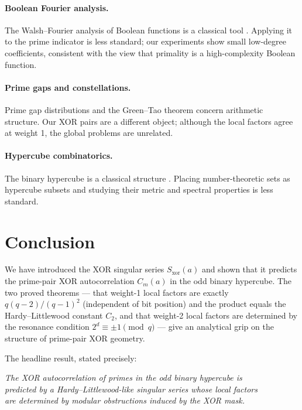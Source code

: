 \documentclass[12pt]{article}
\begin{document}
\paragraph{Boolean Fourier analysis.}
The Walsh--Fourier analysis of Boolean functions is a classical tool
\citep{odonnell2014}.  Applying it to the prime indicator is less standard;
our experiments show small low-degree coefficients, consistent with the
view that primality is a high-complexity Boolean function.

\paragraph{Prime gaps and constellations.}
Prime gap distributions \citep{cramer1936, granville1995, maynard2015} and the
Green--Tao theorem \citep{greentao2008} concern arithmetic structure.
Our XOR pairs are a different object; although the local factors agree at weight 1,
the global problems are unrelated.

\paragraph{Hypercube combinatorics.}
The binary hypercube is a classical structure \citep{macwilliams1977, knuth2011}.
Placing number-theoretic sets as hypercube subsets and studying their
metric and spectral properties is less standard.

\section{Conclusion}
\label{sec:conclusion}

We have introduced the XOR singular series $S_{\mathrm{xor}}(a)$
and shown that it predicts the prime-pair XOR autocorrelation
$C_m(a)$ in the odd binary hypercube.
The two proved theorems --- that weight-1 local factors are exactly
$q(q-2)/(q-1)^2$ (independent of bit position) and the product equals
the Hardy--Littlewood constant $C_2$, and that weight-2 local factors
are determined by the resonance condition $2^d \equiv \pm 1 \pmod q$ ---
give an analytical grip on the structure of prime-pair XOR geometry.

The headline result, stated precisely:

\begin{center}
\textit{The XOR autocorrelation of primes in the odd binary hypercube is\\
predicted by a Hardy--Littlewood-like singular series whose local factors\\
are determined by modular obstructions induced by the XOR mask.}
\end{center}
\end{document}
